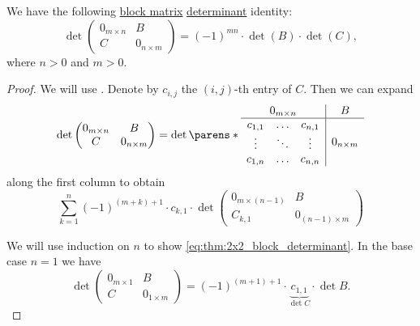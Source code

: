 \begin{lemma}\label{thm:2x2_block_antidiagonal_determinant}
  We have the following \hyperref[def:block_matrix]{block matrix} \hyperref[def:matrix_determinant]{determinant} identity:
  \begin{equation}\label{eq:thm:2x2_block_determinant}
    \det
    \begin{pmatrix}
      0_{m \times n} & B              \\
      C              & 0_{n \times m}
    \end{pmatrix}
    =
    (-1)^{mn} \cdot \det(B) \cdot \det(C),
  \end{equation}
  where \( n > 0 \) and \( m > 0 \).
\end{lemma}
\begin{proof}
  We will use . Denote by \( c_{i,j} \) the \( (i, j) \)-th entry of \( C \). Then we can expand
  \begin{equation*}
    \det
    \begin{pmatrix}
      0_{m \times n} & B              \\
      C              & 0_{n \times m}
    \end{pmatrix}
    =
    \det
    \parens*
      {
        \begin{array}{c | c}
          0_{m \times n} & B              \\
          \hline
          \begin{matrix}
             c_{1,1} & \ldots & c_{n,1} \\
             \vdots  & \ddots & \vdots  \\
             c_{1,n} & \ldots & c_{n,n}
          \end{matrix} & 0_{n \times m}
        \end{array}
      }
  \end{equation*}
  along the first column to obtain
  \begin{equation*}
    \sum_{k=1}^n (-1)^{(m + k) + 1} \cdot c_{k,1} \cdot \det
    \begin{pmatrix}
      0_{m \times (n-1)} & B                  \\
      C_{k,1}            & 0_{(n-1) \times m}
    \end{pmatrix}
  \end{equation*}

  We will use induction on \( n \) to show \eqref{eq:thm:2x2_block_determinant}. In the base case \( n = 1 \) we have
  \begin{equation*}
    \det
    \begin{pmatrix}
      0_{m \times 1} & B              \\
      C              & 0_{1 \times m}
    \end{pmatrix}
    =
    (-1)^{(m + 1) + 1} \cdot \underbrace{c_{1,1}}_{\det C} \cdot \det B.
  \end{equation*}


\end{proof}
